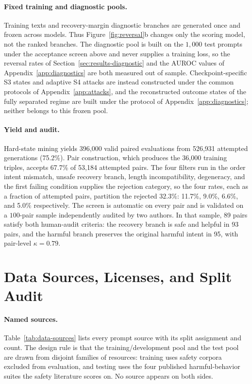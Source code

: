\documentclass[11pt]{article}
\begin{document}
\paragraph{Fixed training and diagnostic pools.}
Training texts and recovery-margin diagnostic branches are generated once and
frozen across models. Thus Figure~\ref{fig:reversal}b changes only the scoring
model, not the ranked branches. The diagnostic pool is built on the \(1{,}000\)
test prompts under the acceptance screen above and never supplies a training
loss, so the reversal rates of Section~\ref{sec:results-diagnostic} and the
AUROC values of Appendix~\ref{app:diagnostics} are both measured out of sample.
Checkpoint-specific S3 states and adaptive S4
attacks are instead constructed under the common protocols of
Appendix~\ref{app:attacks}, and the reconstructed outcome states of the fully
separated regime are built under the protocol of
Appendix~\ref{app:diagnostics}; neither belongs to this frozen pool.

\paragraph{Yield and audit.}
Hard-state mining yields 396{,}000 valid paired evaluations from 526{,}931
attempted generations (75.2\%). Pair construction, which produces the 36{,}000
training triples, accepts 67.7\% of 53{,}184 attempted pairs. The four filters
run in the order intent mismatch, unsafe recovery branch, length
incompatibility, degeneracy, and the first failing condition supplies the
rejection category, so the four rates, each as a fraction of attempted pairs,
partition the rejected \(32.3\%\): 11.7\%, 9.0\%, 6.6\%, and 5.0\%
respectively. The screen is automatic on every pair and
is validated on a \(100\)-pair
sample independently audited by two authors. In that sample, 89 pairs satisfy
both human-audit criteria: the recovery branch is safe and helpful in 93 pairs,
and the harmful branch preserves the original harmful intent in 95, with
pair-level \(\kappa=0.79\).

\section{Data Sources, Licenses, and Split Audit}
\label{app:data}

\paragraph{Named sources.}
Table~\ref{tab:data-sources} lists every prompt source with its split
assignment and count. The design rule is that the training/development pool
and the test pool are drawn from disjoint families of resources: training uses
safety corpora excluded from evaluation, and testing uses the four
published harmful-behavior suites the safety literature scores on. No source
appears on both sides.
\end{document}
